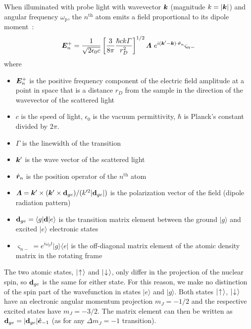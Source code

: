 When illuminated with probe light with wavevector $\bm{k}$ (magnitude
$k=|\bm{k}|$) and angular frequency $\omega_{\text{p}}$, the $n^{\text{th}}$
atom emits a field proportional to its dipole
moment~\cite{cohen1998atom,Ruostekoski2009}:
\begin{equation}
  \bm{E}_{n}^{+}  =
  \frac{ 1 }{ \sqrt{ 2 \epsilon_{0} c }}
    \left[ \frac{3}{8\pi} \frac{ \hbar c k \Gamma }{ r_{D}^{2}} \right]^{1/2}
   \bm{\Lambda} \,\,
    e^{i(\bm{k}'-\bm{k} ) \cdot \hat{\bm{r}}_{n} }
   \varsigma_{n-}
 \label{eq:epropsigma}
\end{equation}
where
\begin{itemize}

\item $\bm{E}_{n}^{+}$ is the positive frequency component of the electric
field amplitude at a point in space that is a distance $r_{D}$ from the sample
in the direction of the wavevector of the scattered light 

\item $c$ is the speed of light, $\epsilon_{0}$ is the vacuum permittivity,
$\hbar$ is Planck's constant divided by $2\pi$. 

\item  $\Gamma$ is the linewidth of the transition

\item $\bm{k}'$ is the wave vector of the scattered light 

\item $\hat{\bm{r}}_{n}$ is the position operator of the $n^{\text{th}}$ atom

\item $\bm{\Lambda} = \bm{k}' \times ( \bm{k}' \times \bm{\mathrm{d}}_{ge})/ (
k'^{2}| \bm{\mathrm{d}}_{ge}|)$ is the polarization vector of the field (dipole
radiation pattern)
 
\item 
$\bm{\mathrm{d}}_{ge} = \langle g | \bm{\mathrm{d}} | e \rangle$  is the
transition matrix element between the ground $|g\rangle$ and excited
$|e\rangle$ electronic states

\item $\varsigma_{n-} = e^{i\omega_{\text{p}}t} |g\rangle\langle e|$ is the
off-diagonal matrix element of the atomic density matrix in the rotating frame
\end{itemize}

The two atomic states, $|\nSspup\rangle$ and $|\nSspdn\rangle$, only differ in
the projection of the nuclear spin,  so $\bm{\mathrm{d}}_{ge}$ is the same for
either state.  For this reason, we make no distinction of the spin part of the
wavefunction in states  $|e\rangle$ and $|g\rangle$.  Both states
$|\nSspup\rangle$, $|\nSspdn\rangle$ have an electronic angular momentum
projection $m_{J}=-1/2$ and the respective excited states have $m_{J}=-3/2$.
The matrix element can then be written as $\bm{\mathrm{d}}_{ge}
=|\bm{\mathrm{d}}_{ge}| \hat{\bm{e}}_{-1} $  (as for any
$\Delta m_{J}=-1$ transition).

